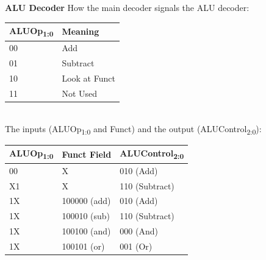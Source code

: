 \documentclass[12pt]{article}
\theoremstyle{definition}
\begin{document}
  \textbf{ALU Decoder}
  How the main decoder signals the ALU decoder: \\
  \begin{tabular} {l | l}
  ALUOp\textsubscript{1:0} & Meaning \\ \hline \hline
  00 & Add \\ \hline
  01 & Subtract \\ \hline
  10 & Look at Funct \\ \hline
  11 & Not Used \\ \hline
  \end{tabular} \\

  The inputs (ALUOp\textsubscript{1:0} and Funct) and the output (ALUControl\textsubscript{2:0}): \\
  \begin{tabular}{l | l | l}
  ALUOp\textsubscript{1:0} & Funct Field & ALUControl\textsubscript{2:0} \\ \hline \hline
  00 & X & 010 (Add) \\ \hline
  X1 & X & 110 (Subtract) \\ \hline
  1X & 100000 (add) & 010 (Add) \\ \hline
  1X & 100010 (sub) & 110 (Subtract) \\ \hline
  1X & 100100 (and) & 000 (And) \\ \hline
  1X & 100101 (or) & 001 (Or)
  \end{tabular}
\end{document}
